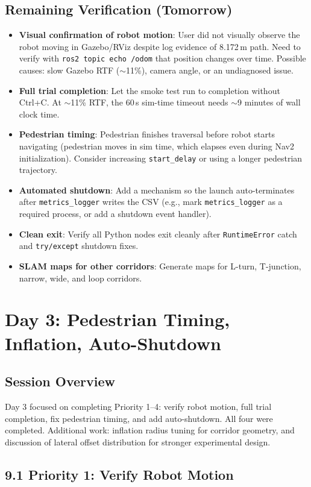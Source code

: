 \documentclass[11pt]{article}
\newcommand{\logentry}[1]{\subsection*{#1}}
\begin{document}
\logentry{Remaining Verification (Tomorrow)}
\begin{itemize}
  \item \textbf{Visual confirmation of robot motion}: User did not visually
    observe the robot moving in Gazebo/RViz despite log evidence of 8.172\,m
    path. Need to verify with \texttt{ros2 topic echo /odom} that position
    changes over time. Possible causes: slow Gazebo RTF ($\sim$11\%), camera
    angle, or an undiagnosed issue.
  \item \textbf{Full trial completion}: Let the smoke test run to completion
    without Ctrl+C. At $\sim$11\% RTF, the 60\,s sim-time timeout needs
    $\sim$9 minutes of wall clock time.
  \item \textbf{Pedestrian timing}: Pedestrian finishes traversal before robot
    starts navigating (pedestrian moves in sim time, which elapses even during
    Nav2 initialization). Consider increasing \texttt{start\_delay} or using a
    longer pedestrian trajectory.
  \item \textbf{Automated shutdown}: Add a mechanism so the launch
    auto-terminates after \texttt{metrics\_logger} writes the CSV (e.g., mark
    \texttt{metrics\_logger} as a required process, or add a shutdown event
    handler).
  \item \textbf{Clean exit}: Verify all Python nodes exit cleanly after
    \texttt{RuntimeError} catch and \texttt{try/except} shutdown fixes.
  \item \textbf{SLAM maps for other corridors}: Generate maps for L-turn,
    T-junction, narrow, wide, and loop corridors.
\end{itemize}


\section*{Day 3: Pedestrian Timing, Inflation, Auto-Shutdown}

\logentry{Session Overview}
Day 3 focused on completing Priority 1--4: verify robot motion, full trial
completion, fix pedestrian timing, and add auto-shutdown. All four were
completed. Additional work: inflation radius tuning for corridor geometry,
and discussion of lateral offset distribution for stronger experimental design.


\subsection*{9.1 Priority 1: Verify Robot Motion}
\end{document}
